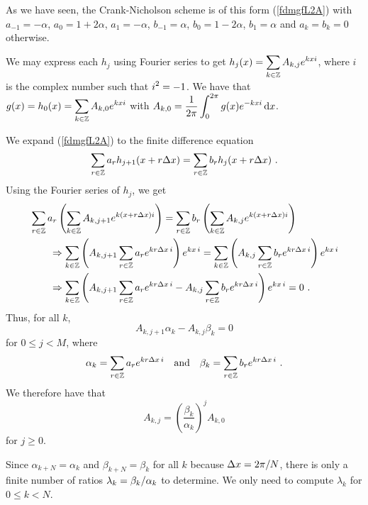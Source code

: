 \begin{egg}
As we have seen, the Crank-Nicholson scheme is of this form
(\ref{fdmgfL2A}) with $a_{-1}=-\alpha$, $a_0 = 1+2\alpha$, $a_1=-\alpha$, 
$b_{-1} =\alpha$, $b_0 = 1-2\alpha$, $b_1 = \alpha$ and
$a_k = b_k = 0$ otherwise.
\end{egg}

We may express each $h_j$ using Fourier series to get
$\displaystyle h_j(x) = \sum_{k\in \mathbb{Z}} A_{k,j} e^{kxi}$, where $i$
is the complex number such that $\displaystyle i^2=-1$.  We have that
$\displaystyle g(x) = h_0(x) = \sum_{k\in \mathbb{Z}} A_{k,0} e^{kxi}$
with $\displaystyle A_{k,0} = \frac{1}{2\pi} \int_0^{2\pi} g(x) e^{-kxi}\,\mathrm{d}x$.

We expand (\ref{fdmgfL2A}) to the finite difference equation
\begin{equation}\label{fdmgfL2B}
\sum_{r\in \mathbb{Z}} a_r h_{j+1}(x+r\Delta{x}) =
\sum_{r\in \mathbb{Z}} b_r h_j(x+r\Delta{x}) \ .
\end{equation}
Using the Fourier series of $h_j$, we get
\begin{align*}
&\sum_{r\in \mathbb{Z}} a_r \left( \sum_{k\in \mathbb{Z}} A_{k,j+1} e^{k(x+r\Delta{x})i}\right)
 = \sum_{r\in \mathbb{Z}} b_r \left( \sum_{k\in \mathbb{Z}} A_{k,j} e^{k(x+r\Delta{x})i}\right)  \\
& \qquad \Rightarrow
\sum_{k\in \mathbb{Z}}\left( A_{k,j+1} \sum_{r\in \mathbb{Z}} a_r e^{kr \Delta{x}\, i} \right)
e^{k x\,i}
= \sum_{k\in \mathbb{Z}}\left( A_{k,j} \sum_{r\in\mathbb{Z}} b_r  e^{k r \Delta{x}\, i} \right)
e^{k x\,i} \\
& \qquad \Rightarrow
\sum_{k\in \mathbb{Z}}\left( A_{k,j+1} \sum_{r\in \mathbb{Z}} a_r e^{k r \Delta{x}\, i}
- A_{k,j} \sum_{r\in \mathbb{Z}} b_r e^{k r \Delta{x}\, i} \right) e^{k x\,i} = 0 \ .
\end{align*}
Thus, for all $k$,
\begin{equation}\label{fdmgfL2C}
  A_{k,j+1} \alpha_k -  A_{k,j}  \beta_k = 0
\end{equation}
for $0\leq j < M$, where
\[
\alpha_k = \sum_{r\in \mathbb{Z}} a_r e^{k r \Delta{x}\, i} \quad \text{and} \quad
\beta_k = \sum_{r\in \mathbb{Z}} b_r  e^{k r \Delta{x}\, i}  \ .
\]
We therefore have that
\[
  A_{k,j} = \left(\frac{\beta_k}{\alpha_k}\right)^j A_{k,0}
\]
for $j \geq 0$.

Since $\alpha_{k+N} = \alpha_k$ and $\beta_{k+N} = \beta_k$ for all
$k$ because $\Delta{x} = 2\pi/N$, there is only a finite number of
ratios $\displaystyle \lambda_k = \beta_k/\alpha_k$ to
determine.  We only need to compute $\lambda_k$ for $0 \leq k < N$.

